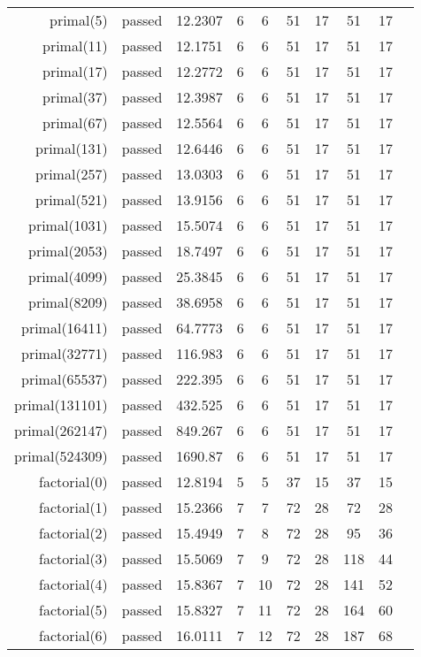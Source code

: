 \begin{longtable}{r|ccccccccc}
    primal(5) & passed & 12.2307 & 6 & 6 & 51 & 17 & 51 & 17 \\
    primal(11) & passed & 12.1751 & 6 & 6 & 51 & 17 & 51 & 17 \\
    primal(17) & passed & 12.2772 & 6 & 6 & 51 & 17 & 51 & 17 \\
    primal(37) & passed & 12.3987 & 6 & 6 & 51 & 17 & 51 & 17 \\
    primal(67) & passed & 12.5564 & 6 & 6 & 51 & 17 & 51 & 17 \\
    primal(131) & passed & 12.6446 & 6 & 6 & 51 & 17 & 51 & 17 \\
    primal(257) & passed & 13.0303 & 6 & 6 & 51 & 17 & 51 & 17 \\
    primal(521) & passed & 13.9156 & 6 & 6 & 51 & 17 & 51 & 17 \\
    primal(1031) & passed & 15.5074 & 6 & 6 & 51 & 17 & 51 & 17 \\
    primal(2053) & passed & 18.7497 & 6 & 6 & 51 & 17 & 51 & 17 \\
    primal(4099) & passed & 25.3845 & 6 & 6 & 51 & 17 & 51 & 17 \\
    primal(8209) & passed & 38.6958 & 6 & 6 & 51 & 17 & 51 & 17 \\
    primal(16411) & passed & 64.7773 & 6 & 6 & 51 & 17 & 51 & 17 \\
    primal(32771) & passed & 116.983 & 6 & 6 & 51 & 17 & 51 & 17 \\
    primal(65537) & passed & 222.395 & 6 & 6 & 51 & 17 & 51 & 17 \\
    primal(131101) & passed & 432.525 & 6 & 6 & 51 & 17 & 51 & 17 \\
    primal(262147) & passed & 849.267 & 6 & 6 & 51 & 17 & 51 & 17 \\
    primal(524309) & passed & 1690.87 & 6 & 6 & 51 & 17 & 51 & 17 \\
    factorial(0) & passed & 12.8194 & 5 & 5 & 37 & 15 & 37 & 15 \\
    factorial(1) & passed & 15.2366 & 7 & 7 & 72 & 28 & 72 & 28 \\
    factorial(2) & passed & 15.4949 & 7 & 8 & 72 & 28 & 95 & 36 \\
    factorial(3) & passed & 15.5069 & 7 & 9 & 72 & 28 & 118 & 44 \\
    factorial(4) & passed & 15.8367 & 7 & 10 & 72 & 28 & 141 & 52 \\
    factorial(5) & passed & 15.8327 & 7 & 11 & 72 & 28 & 164 & 60 \\
    factorial(6) & passed & 16.0111 & 7 & 12 & 72 & 28 & 187 & 68 \\

\end{longtable}
